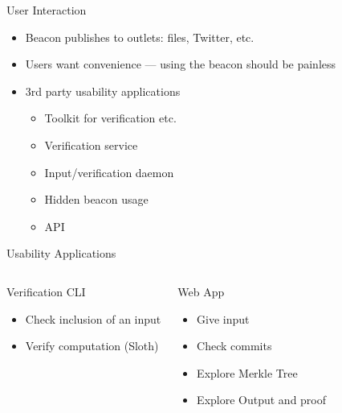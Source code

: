 \begin{frame}[t]{User Interaction}
    \begin{itemize}
        \item Beacon publishes to outlets: files, Twitter, etc.
        \item Users want convenience --- using the beacon should be painless
        \item 3rd party usability applications
            \begin{itemize}
                \item Toolkit for verification etc.
                \item Verification service
                \item Input/verification daemon
                \item Hidden beacon usage
                \item API
            \end{itemize}
    \end{itemize}
\end{frame}

\begin{frame}[t]{Usability Applications}
    \begin{columns}[T,onlytextwidth]

        \begin{block}{Verification CLI}
            \begin{itemize}
                \item Check inclusion of an input
                \item Verify computation (Sloth)
            \end{itemize}
        \end{block}


        \begin{block}{Web App}
            \begin{itemize}
                \item Give input
                \item Check commits
                \item Explore Merkle Tree
                \item Explore Output and proof
            \end{itemize}
        \end{block}

    \end{columns}
\end{frame}




